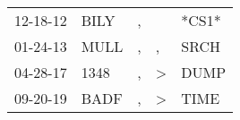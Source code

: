 \begin{supertabular}{lllll}
 12-18-12 &  BILY &  , &               &  *CS1* \\
 01-24-13 &  MULL &  , &             , &   SRCH \\
 04-28-17 &  1348 &  , &  \textgreater &   DUMP \\
 09-20-19 &  BADF &  , &  \textgreater &   TIME \\
\end{supertabular}
